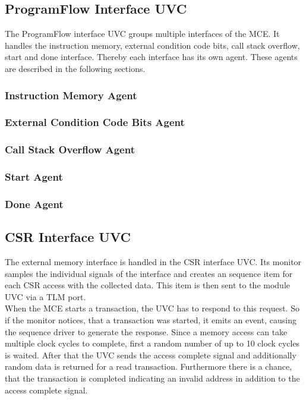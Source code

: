 \subsection{ProgramFlow Interface UVC}

The ProgramFlow interface UVC groups multiple interfaces of the MCE. 
It handles the instruction memory, external condition code bits, call stack overflow, start and done interface.
Thereby each interface has its own agent.
These agents are described in the following sections.

\subsubsection{Instruction Memory Agent}

\subsubsection{External Condition Code Bits Agent}

\subsubsection{Call Stack Overflow Agent}

\subsubsection{Start Agent}

\subsubsection{Done Agent}

\subsection{CSR Interface UVC}

The external memory interface is handled in the CSR interface UVC.
Its monitor samples the individual signals of the interface and creates an sequence item for each CSR access with the collected data.
This item is then sent to the module UVC via a TLM port.\\
When the MCE starts a transaction, the UVC has to respond to this request.
So if the monitor notices, that a transaction was started, it emits an event, causing the sequence driver to generate the response.
Since a memory access can take multiple clock cycles to complete, first a random number of up to 10 clock cycles is waited.
After that the UVC sends the access complete signal and additionally random data is returned for a read transaction.
Furthermore there is a chance, that the transaction is completed indicating an invalid address in addition to the access complete signal.


